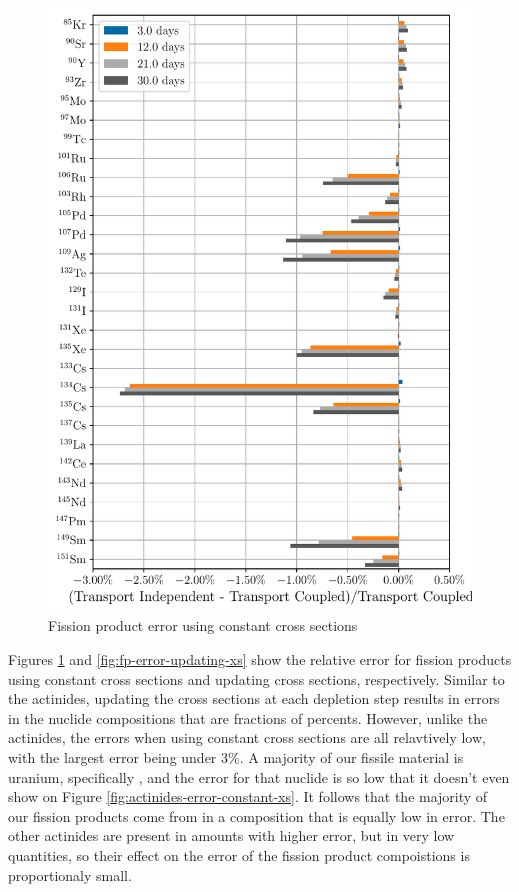     \begin{figure}[h!tpb]
        \centering
        \includegraphics[width=\linewidth]{figs/fission_products_constant_xs_predictor_fission_q_days.pdf}
        \caption{Fission product error using constant cross sections}
        \label{fig:fp-error-constant-xs}
    \end{figure}

    Figures \ref{fig:fp-error-constant-xs} and \ref{fig:fp-error-updating-xs}
    show the relative error for fission products using constant cross sections
    and updating cross sections, respectively.
    Similar to the actinides, updating the cross sections at each depletion step
    results in errors in the nuclide compositions  that are fractions of
    percents. However, unlike the actinides, the errors when using constant
    cross sections are all relavtively low, with the largest error being under
    3\%. A majority of our fissile material is uranium, specifically
    , and the error for that nuclide is so low that it doesn't even
    show on Figure \ref{fig:actinides-error-constant-xs}. It follows that the
    majority of our fission products come from  in a composition
    that is equally low in error. The other actinides are present in amounts
    with higher error, but in very low quantities, so their effect on the error
    of the fission product compoistions is proportionaly small.
    
